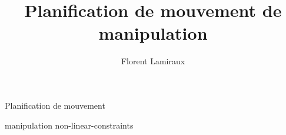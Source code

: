 \documentclass[xcolor = {svgnames,x11names}]{beamer}
\title {Planification de mouvement de manipulation}
\subtitle{}
\author[]
{Florent Lamiraux}
\institute[CNRS-LAAS] %
{
  CNRS-LAAS, Toulouse, France
}
\date[] %
{}
\begin{document}
\lstset{
breakatwhitespace=true,
breaklines=true
tabsize=3, 
}

\begin{frame}
  \titlepage
\end{frame}

%
\begin{frame}{Planification de mouvement}
\end{frame}

 {manipulation}
 {non-linear-constraints}
\end{document}
